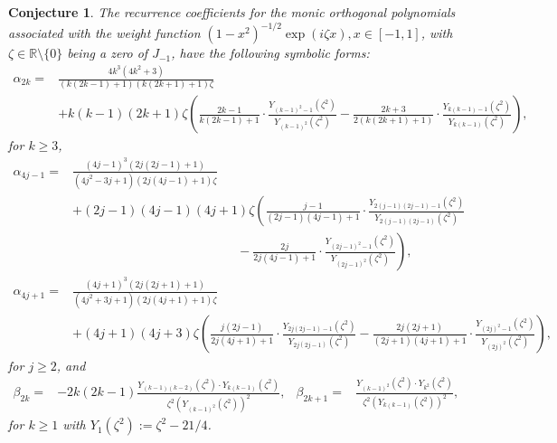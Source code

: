 \documentclass[11pt,a4paper]{article}
\newtheorem{remark}[theorem]{Remark}
\newtheorem{conjecture}[theorem]{Conjecture}
\numberwithin{equation}{section}
\begin{document}
\begin{conjecture}
The recurrence coefficients for the monic orthogonal polynomials associated with the weight function $(1-x^2)^{-1/2}\exp(i\zeta x), x\in[-1,1]$, with $\zeta\in\mathbb{R}\setminus\{0\}$ being a zero of $J_{-1}$, have the following symbolic forms:
\begin{align*}
\alpha_{2k}=&\frac{4k^3(4k^2+3)}{(k(2k-1)+1)(k(2k+1)+1)\zeta}\\
&+k(k-1)(2k+1)\zeta\left(\frac{2k-1}{k(2k-1)+1}\cdot\frac{Y_{(k-1)^2-1}(\zeta^2)}{Y_{(k-1)^2}(\zeta^2)}-\frac{2k+3}{2(k(2k+1)+1)}\cdot\frac{Y_{k(k-1)-1}(\zeta^2)}{Y_{k(k-1)}(\zeta^2)}\right), \end{align*}
for $k\geq3$,
\begin{align*}
\alpha_{4j-1}=&\frac{(4j-1)^3(2j(2j-1)+1)}{(4j^2-3j+1)(2j(4j-1)+1)\zeta}\\
&+(2j-1)(4j-1)(4j+1)\zeta\left(\frac{j-1 }{(2j-1)(4j-1)+1}\cdot\frac{Y_{2(j-1)(2j-1)-1}(\zeta^2)}{Y_{2(j-1)(2j-1)}(\zeta^2)}\right.\\
&\left.\qquad\qquad\qquad\qquad\qquad\qquad\quad-\frac{2j }{2j(4j-1)+1}\cdot\frac{Y_{(2j-1)^2-1}(\zeta^2)}{Y_{(2j-1)^2}(\zeta^2)}\right),
\end{align*}
\begin{align*}
\alpha_{4j+1}=&\frac{(4j+1)^3(2j(2j+1)+1)}{(4j^2+3j+1)(2j(4j+1)+1)\zeta}\\
&+(4j+1)(4j+3)\zeta \left(\frac{j(2j-1) }{2j(4j+1)+1}\cdot\frac{Y_{2j(2j-1)-1}(\zeta^2)}{Y_{2j(2j-1)}(\zeta^2)}-\frac{2j(2j+1) }{(2j+1)(4j+1)+1}\cdot\frac{Y_{(2j)^2-1}(\zeta^2)}{Y_{(2j)^2}(\zeta^2)}\right),
\end{align*}
for $j\geq2$, and
\begin{align*}
\beta_{2k} =& -2k(2k-1)\frac{Y_{(k-1)(k-2)}(\zeta^2)\cdot Y_{k(k-1)}(\zeta^2)}{\zeta^2 \left(Y_{(k-1)^2}(\zeta^2)\right)^2},& \beta_{2k+1} =& \frac{Y_{(k-1)^2}(\zeta^2)\cdot Y_{k^2}(\zeta^2)}{\zeta^2 \left(Y_{k(k-1)}(\zeta^2)\right)^2},
\end{align*}
for $k\geq1$ with $Y_1(\zeta^2):=\zeta^2-21/4$.
\end{conjecture}
\end{document}
